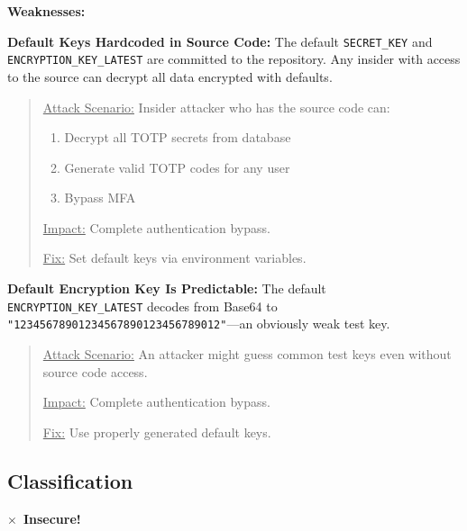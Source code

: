 \documentclass[11pt,a4paper]{article}
\newcommand{\insecure}{\textcolor{dangerred}{$\times$~\textbf{Insecure!}}}
\begin{document}
\textbf{Weaknesses:}

\textbf{Default Keys Hardcoded in Source Code:} The default \texttt{SECRET\_KEY} and \texttt{ENCRYPTION\_KEY\_LATEST} are committed to the repository. Any insider with access to the source can decrypt all data encrypted with defaults.

\begin{quote}
\underline{Attack Scenario:} Insider attacker who has the source code can:
\begin{enumerate}[noitemsep]
    \item Decrypt all TOTP secrets from database
    \item Generate valid TOTP codes for any user
    \item Bypass MFA
\end{enumerate}

\underline{Impact:} Complete authentication bypass.

\underline{Fix:} Set default keys via environment variables.
\end{quote}

\textbf{Default Encryption Key Is Predictable:} The default \texttt{ENCRYPTION\_KEY\_LATEST} decodes from Base64 to \texttt{"12345678901234567890123456789012"}---an obviously weak test key.

\begin{quote}
\underline{Attack Scenario:} An attacker might guess common test keys even without source code access.

\underline{Impact:} Complete authentication bypass.

\underline{Fix:} Use properly generated default keys.
\end{quote}

\subsection{Classification}
\insecure
\end{document}
